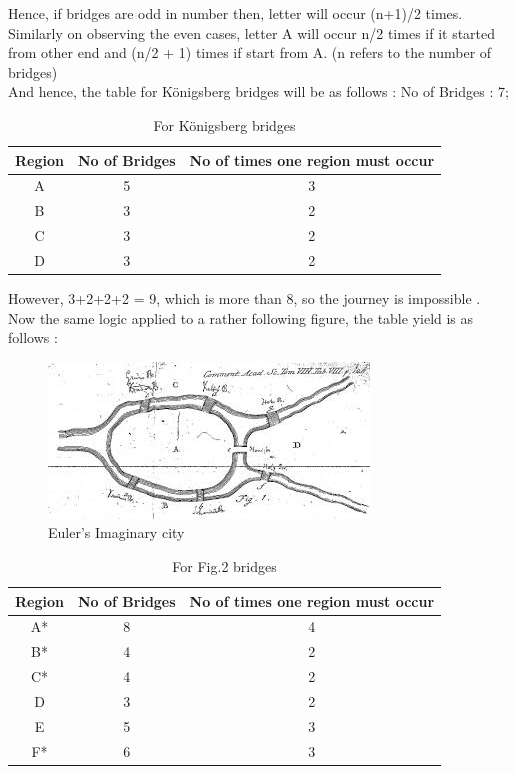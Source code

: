 \documentclass[acmsmall]{acmart}
\begin{document}
Hence, if bridges are odd in number then, letter will occur (n+1)/2 times.\\

Similarly on observing the even cases, letter A will occur n/2 times if it started from other
end and (n/2 + 1) times if start from A. (n refers to the number of bridges)\\

And hence, the table for Königsberg bridges will be as follows :
No of Bridges : 7;

\begin{table}[h!]
  \caption{For Königsberg bridges}
  \label{tab:first}
  \begin{tabular}{c c c}
    \toprule
    Region&No of Bridges& No of times one region must occur\\
    \midrule
    A & 5& 3\\
    B & 3& 2\\
    C & 3& 2\\
    D & 3& 2\\
  \bottomrule
\end{tabular}
\end{table}

However, 3+2+2+2 = 9, which is more than 8, so the journey is impossible .\\
Now the same logic applied to a rather following figure, the table yield is as follows :\\

\begin{figure}[h]
  \centering
  \includegraphics[width=\linewidth]{1}
  \caption{Euler's Imaginary city}
\end{figure}


\begin{table}[h!]
  \caption{For Fig.2 bridges}
  \label{tab:sec}
  \begin{tabular}{c c c}
    \toprule
    Region&No of Bridges& No of times one region must occur\\
    \midrule
    A* & 8& 4\\
    B* & 4& 2\\
    C* & 4& 2\\
    D &  3& 2\\
    E &  5& 3\\
    F* & 6& 3\\
  
  \bottomrule
\end{tabular}
\end{table}
\end{document}
